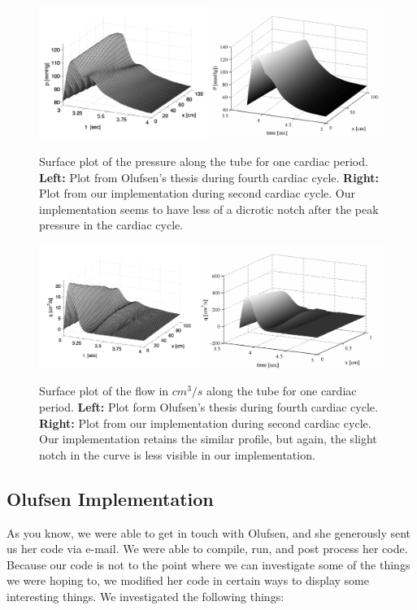 \documentclass[12pt]{article}
\begin{document}
\begin{figure}[ht]
	\centering
	\includegraphics[width=6in]{pplot}
	\label{ours}
	\caption{Surface plot of the pressure along the tube for one cardiac period. \textbf{Left:} Plot from Olufsen's thesis during fourth cardiac cycle. \textbf{Right:} Plot from our implementation during second cardiac cycle. Our implementation seems to have less of a dicrotic notch after the peak pressure in the cardiac cycle.}
\end{figure}

\begin{figure}[ht]
	\centering
	\includegraphics[width=6in]{qplot}
	\label{ours}
	\caption{Surface plot of the flow in $cm^3/s$ along the tube for one cardiac period. \textbf{Left:} Plot form Olufsen's thesis during fourth cardiac cycle. \textbf{Right: } Plot from our implementation during second cardiac cycle. Our implementation retains the similar profile, but again, the slight notch in the curve is less visible in our implementation.}
\end{figure}

\pagebreak

\subsection{Olufsen Implementation}
As you know, we were able to get in touch with Olufsen, and she generously sent us her code via e-mail. We were able to compile, run, and post process her code. Because our code is not to the point where we can investigate some of the things we were hoping to, we modified her code in certain ways to display some interesting things. We investigated the following things:
\end{document}
